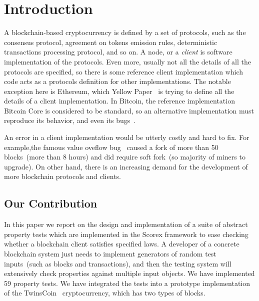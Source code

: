 
\section{Introduction}

A blockchain-based cryptocurrency is defined by a set of protocols, such as the consensus protocol, agreement on tokens emission rules, deterministic transactions processing protocol, and so on. A node, or a {\em client} is software implementation of the protocols. Even more, usually not all the details of all the protocols are specified, so there is some reference client implementation which code acts as a protocols definition for other implementations. The notable exception here is Ethereum, which Yellow Paper~\cite{ethyp} is trying to define all the details of a client implementation. In Bitcoin, the reference implementation Bitcoin Core is considered to be standard, so an alternative implementation must reproduce its behavior, and even its bugs~\cite{bitbugs}. 

An error in a client implementation would be utterly costly and hard to fix. For example,the famous value oveflow bug~\cite{overflow} caused a fork of more than 50 blocks~(more than 8 hours) and did require soft fork~(so majority of miners to upgrade). On other hand, there is an increasing demand for the development of more blockchain protocols and clients. 


\subsection{Our Contribution}

In this paper we report on the design and implementation of a suite of abstract property tests which are implemented in the Scorex framework to ease checking whether a blockchain client satisfies specified laws. A developer of a concrete blockchain system just needs to implement generators of random test inputs~(such as blocks and transactions), and then the testing system will extensively check properties against multiple input objects. We have implemented 59 property tests. We have integrated the tests into a prototype implementation of the TwinsCoin~\cite{chepurnoy2017twinscoin} cryptocurrency, which has two types of blocks.  

